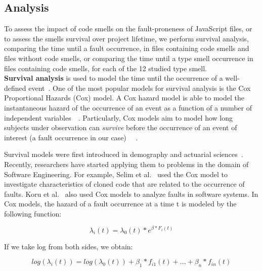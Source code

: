 \subsection{Analysis}\label{survival}
To assess the impact of code smells on the fault-proneness {\color{blue}of JavaScript files, or to assess the smells survival over project lifetime,} we perform survival analysis, comparing the time until {\color{blue}a fault occurrence}, in files containing code smells and files without code smells, {\color{blue}or comparing the time until a type smell occurrence in files containing code smells, for each of the 12 studied type smell.}\\
\textbf{Survival analysis} is used to model the time until the occurrence of a well-defined event~\cite{fox2010r}. One of the most popular models for survival analysis is the Cox Proportional Hazards (Cox) model. A Cox hazard model is able to model the instantaneous hazard of the occurrence of an event as a function of a number of independent variables~\cite{koru2008theory}~\cite{singer2003applied}. Particularly, Cox models aim to model how long subjects under observation can \textsl{survive} before the occurrence of an event of interest (a fault occurrence in our case) ~\cite{singer2003applied}~\cite{selim2010studying}.

Survival models were first introduced in demography and actuarial sciences~\cite{Westergaard}. Recently, researchers have started applying them to problems in the domain of Software Engineering. For example, Selim et al.~\cite{selim2010studying} used the Cox model to investigate characteristics of cloned code that are related to the occurrence of faults. Koru et al.~\cite{koru2007modeling} also used Cox models to analyze faults in software systems. %
In Cox models, the hazard of a fault occurrence at a time t is modeled by the following function:

\begin{equation}\label{eq1}
\lambda_{i}(t) = \lambda_{0}(t)* e ^ {\beta*{F_{i}}(t)}
\end{equation}

If we take log from both sides, we obtain:

\begin{equation}\label{eq2}
log(\lambda_{i}(t)) = log(\lambda_{0}(t)) + {\beta_{1}*{f_{i1}}(t)} + ... + {\beta_{n}*{f_{in}}(t)}
\end{equation}

